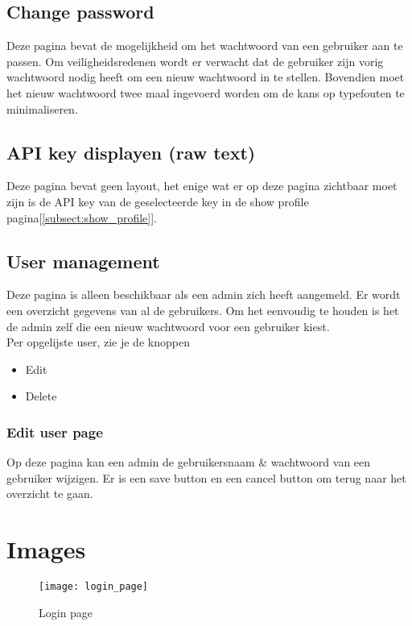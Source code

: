 \documentclass{article}
\begin{document}
\subsection{Change password}
\label{subsect:change_password}
Deze pagina bevat de mogelijkheid om het wachtwoord van een gebruiker aan te passen. Om veiligheidsredenen wordt er verwacht dat de gebruiker zijn vorig wachtwoord nodig heeft om een nieuw wachtwoord in te stellen. Bovendien moet het nieuw wachtwoord twee maal ingevoerd worden om de kans op typefouten te minimaliseren.


\subsection{API key displayen (raw text)}
\label{subsect:raw_api}
Deze pagina bevat geen layout, het enige wat er op deze pagina zichtbaar moet zijn is de API key van de geselecteerde key in de show profile pagina[\ref{subsect:show_profile}].


\subsection{User management}
\label{subsect: user management}
Deze pagina is alleen beschikbaar als een admin zich heeft aangemeld. Er wordt een overzicht gegevens van al de gebruikers. Om het eenvoudig te houden is het de admin zelf die een nieuw wachtwoord voor een gebruiker kiest. \\

Per opgelijste user, zie je de knoppen 
\begin{itemize}
    \item Edit
    \item Delete
\end{itemize}


\subsubsection{Edit user page}
Op deze pagina kan een admin de gebruikersnaam \& wachtwoord van een gebruiker wijzigen. Er is een save button en een cancel button om terug naar het overzicht te gaan.



\pagebreak

\section{Images}

\begin{figure}[!h]
    \centering
    \texttt{[image: login\_page]}
    \caption{Login page}
    \label{fig:login page}
\end{figure}
\end{document}
